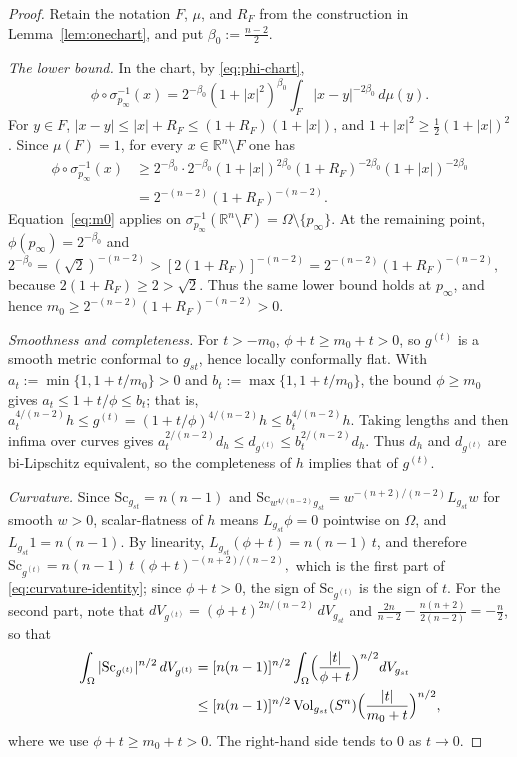 \documentclass[12pt,oneside,a4paper]{article}
\theoremstyle{mytheorem}
\theoremstyle{remark}
\theoremstyle{definition}
\begin{document}
\begin{proof}
Retain the notation $F$, $\mu$, and $R_F$ from the construction in
Lemma~\ref{lem:onechart}, and put $\beta_0:=\frac{n-2}{2}$.

\emph{The lower bound.}  In the chart, by \eqref{eq:phi-chart},
\[
 \phi\circ\sigma_{p_\infty}^{-1}(x)
 =2^{-\beta_0}(1+|x|^2)^{\beta_0}
  \int_F|x-y|^{-2\beta_0}\,d\mu(y).
\]
For $y\in F$, $|x-y|\leq|x|+R_F\leq(1+R_F)(1+|x|)$, and
$1+|x|^2\geq\frac12(1+|x|)^2$.  Since $\mu(F)=1$, for every
$x\in\mathbb R^n\setminus F$ one has
\begin{equation}\label{eq:m0}
\begin{aligned}
 \phi\circ\sigma_{p_\infty}^{-1}(x)
 &\geq 2^{-\beta_0}\cdot2^{-\beta_0}(1+|x|)^{2\beta_0}
 (1+R_F)^{-2\beta_0}(1+|x|)^{-2\beta_0}\\
 &=2^{-(n-2)}(1+R_F)^{-(n-2)}.
\end{aligned}
\end{equation}
Equation~\eqref{eq:m0} applies on
$\sigma_{p_\infty}^{-1}(\mathbb R^n\setminus F)
=\Omega\setminus\{p_\infty\}$.  At the remaining point,
$\phi(p_\infty)=2^{-\beta_0}$ and
$2^{-\beta_0}=(\sqrt2)^{-(n-2)}
>[2(1+R_F)]^{-(n-2)}
=2^{-(n-2)}(1+R_F)^{-(n-2)},$
because $2(1+R_F)\geq2>\sqrt2$.  Thus the same lower bound holds at
$p_\infty$, and hence
$m_0\geq2^{-(n-2)}(1+R_F)^{-(n-2)}>0$.

\emph{Smoothness and completeness.}  For $t>-m_0$, $\phi+t\ge m_0+t>0$,
so $g^{(t)}$ is a smooth metric conformal to $g_{st}$, hence
locally conformally flat.  With
$a_t:=\min\{1,1+t/m_0\}>0$ and $b_t:=\max\{1,1+t/m_0\}$, the bound
$\phi\ge m_0$ gives $a_t\le1+t/\phi\le b_t$; that is,
$a_t^{4/(n-2)}h\le g^{(t)}=(1+t/\phi)^{4/(n-2)}h\le b_t^{4/(n-2)}h$.
Taking lengths and then infima over curves gives
\(a_t^{2/(n-2)}d_h\le d_{g^{(t)}}\le b_t^{2/(n-2)}d_h\).
Thus $d_h$ and $d_{g^{(t)}}$ are bi-Lipschitz equivalent, so the
completeness of $h$ implies that of $g^{(t)}$.

\emph{Curvature.}
Since $\mathrm{Sc}_{g_{st}}=n(n-1)$ and
$\mathrm{Sc}_{w^{4/(n-2)}g_{st}}=w^{-(n+2)/(n-2)}L_{g_{st}}w$
for smooth $w>0$, scalar-flatness of $h$ means
$L_{g_{st}}\phi=0$ pointwise on \(\Omega\), and
$L_{g_{st}}1=n(n-1)$.  By
linearity, $L_{g_{st}}(\phi+t)=n(n-1)\,t$, and therefore
$\mathrm{Sc}_{g^{(t)}}
=n(n-1)\,t\,(\phi+t)^{-(n+2)/(n-2)},$
which is the first part of \eqref{eq:curvature-identity}; since
$\phi+t>0$, the sign of $\mathrm{Sc}_{g^{(t)}}$ is the sign of $t$.
For the second part, note that
$dV_{g^{(t)}}=(\phi+t)^{2n/(n-2)}\,dV_{g_{st}}$ and
$\frac{2n}{n-2}-\frac{n(n+2)}{2(n-2)}=-\frac n2$, so that
\[
\begin{aligned}
 \int_\Omega|\mathrm{Sc}_{g^{(t)}}|^{n/2}\,dV_{g^{(t)}}
 &=[n(n-1)]^{n/2}
 \int_\Omega\Bigl(\frac{|t|}{\phi+t}\Bigr)^{n/2}dV_{g_{st}}\\
 &\le[n(n-1)]^{n/2}\operatorname{Vol}_{g_{st}}(S^n)
 \Bigl(\frac{|t|}{m_0+t}\Bigr)^{n/2},
\end{aligned}
\]
where we use $\phi+t\ge m_0+t>0$.  The right-hand side tends to $0$
as $t\to0$.


\end{proof}
\end{document}
